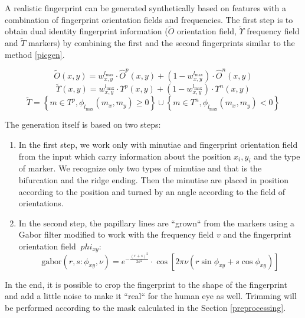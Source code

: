 A realistic fingerprint can be generated synthetically based on features with a combination of fingerprint orientation fields and frequencies. The first step is to obtain dual identity fingerprint information ($ \tilde{O} $ orientation field, $ \tilde{\Upsilon} $ frequency field and $ \tilde{T} $ markers) by combining the first and the second fingerprints similar to the method \ref{picgen}. \cite{morphing_paper}

\begin{equation}
    \tilde{O}(x, y)=w_{x, y}^{l_{\max }} \cdot \hat{O}^{p}(x, y)+\left(1-w_{x, y}^{l_{\max }}\right) \cdot \hat{O}^{n}(x, y)
\end{equation}
\begin{equation}
    \tilde{\Upsilon}(x, y)=w_{x, y}^{l_{\max }} \cdot \Upsilon^{p}(x, y)+\left(1-w_{x, y}^{l_{\max }}\right) \cdot \Upsilon^{n}(x, y)
\end{equation}
\begin{equation}
\tilde{T}=\left\{m \in T^{p}, \phi_{l_{\max }}\left(m_{x}, m_{y}\right) \geq 0\right\} 
\cup\left\{m \in T^{n}, \phi_{l_{\max }}\left(m_{x}, m_{y}\right)<0\right\}
\end{equation}

The generation itself is based on two steps:

\begin{enumerate}
    \item In the first step, we work only with minutiae and fingerprint orientation field from the input which carry information about the position $ x_i, y_i $ and the type of marker. We recognize only two types of minutiae and that is the bifurcation and the ridge ending. Then the minutiae are placed in position according to the position and turned by an angle according to the field of orientations. \cite{syntetic_gen_paper}
    
    \item In the second step, the papillary lines are ``grown`` from the markers using a Gabor filter modified to work with the frequency field $v$ and the fingerprint orientation field $ \ phi_{x y} $: \cite{syntetic_gen_paper}
    \begin{equation}
        \text{gabor}\left(r, s: \phi_{x y}, \nu\right)=e^{-\frac{(r+s)^{2}}{2 \sigma^{2}}} \cdot \cos \left[2 \pi \nu\left(r \sin \phi_{x y}+s \cos \phi_{x y}\right)\right]
    \end{equation}
\end{enumerate}

In the end, it is possible to crop the fingerprint to the shape of the fingerprint and add a little noise to make it ``real`` for the human eye as well. Trimming will be performed according to the mask calculated in the Section \ref{preprocessing}.

